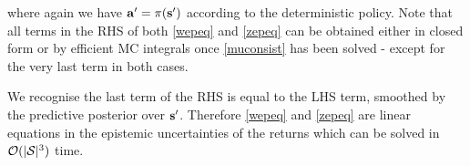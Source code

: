 \documentclass{article}
\begin{document}
where again we have $\mathbf{a}' = \pi(\mathbf{s}')$ according to the deterministic policy. Note that all terms in the RHS of both \cref{wepeq} and \cref{zepeq} can be obtained either in closed form or by efficient MC integrals once \cref{muconsist} has been solved - except for the very last term in both cases.

We recognise the last term of the RHS is equal to the LHS term, smoothed by the predictive posterior over $\mathbf{s}'$. Therefore \cref{wepeq} and \cref{zepeq} are linear equations in the epistemic uncertainties of the returns which can be solved in $\mathcal{O}(|\mathcal{S}|^3)$ time.




\end{document}
